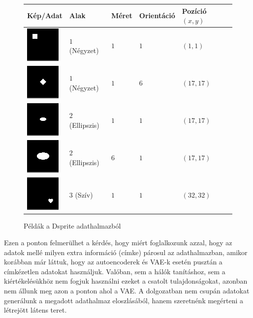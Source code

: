 \begin{figure}[h!]
\begin{center}

\begin{tabular}{| m{2.5cm} | m{2.5cm} | m{2cm}  | m{2cm} |  m{2.5cm} |}
\hline
Kép/Adat & Alak & Méret & Orientáció & Pozíció $(x,y)$ \\
\hline\hline
\includegraphics{sample00000.png} & $1$ (Négyzet) & $1$ & $1$ & $(1,1)$ \\
\hline
\includegraphics{sample0051616.png} & $1$ (Négyzet) & $1$ & $6$ & $(17,17)$ \\
\hline
\includegraphics{sample1001616.png} & $2$ (Ellipszis) & $1$ & $1$ & $(17,17)$ \\
\hline
\includegraphics{sample1501616.png} & $2$ (Ellipszis) & $6$ & $1$ & $(17,17)$ \\
\hline
\includegraphics{sample2003131.png} & $3$ (Szív) & $1$ & $1$ & $(32,32)$ \\
\hline
\end{tabular}
\end{center}
\caption{Példák a Dsprite adathalmazból}\label{samples}
\end{figure}

Ezen a ponton felmerülhet a kérdés, hogy miért foglalkozunk azzal, hogy az adatok mellé milyen extra információ (címke) párosul az adathalmazban, amikor korábban már láttuk, hogy az autoencoderek és VAE-k esetén pusztán a címkézetlen adatokat használjuk. Valóban, sem a hálók tanításhoz, sem a kiértékelésükhöz nem fogjuk használni ezeket a csatolt tulajdonságokat, azonban nem állunk meg azon a ponton ahol a VAE. A dolgozatban nem csupán adatokat generálunk a megadott adathalmaz eloszlásából, hanem szeretnénk megérteni a létrejött látens teret.

